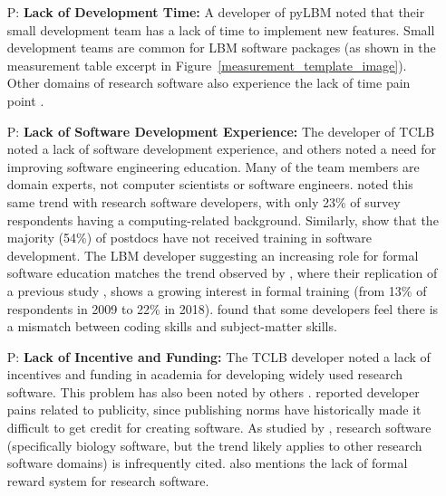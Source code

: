 \documentclass[final, 3p, times, authoryear]{elsarticle}
\newcounter{pnum} %
\begin{document}
\begin{enumerate}

	\item[P\refstepcounter{pnum}\thepnum \label{P_LackDevTime}:] \textbf{Lack of
	Development Time:} A developer of pyLBM noted that their small development
	team has a lack of time to implement new features. Small development teams
	are common for LBM software packages (as shown in the measurement table
	excerpt in Figure~\ref{measurement_template_image}). Other domains of
	research software also experience the lack of time pain point
	\citep{PintoEtAl2018, PintoEtAl2016, WieseEtAl2019}.

	\item[P\refstepcounter{pnum}\thepnum \label{P_LackSoftDevExp}:] \textbf{Lack
	of Software Development Experience:} The developer of TCLB noted a lack of
	software development experience, and others noted a need for improving
	software engineering education. Many of the team members are domain experts,
	not computer scientists or software engineers. \citet{Nguyen-HoanEtAl2010}
	noted this same trend with research software developers, with only 23\% of
	survey respondents having a computing-related background. Similarly,
	\citet{UditAndKatz2017} show that the majority (54\%) of postdocs have not
	received training in software development.  The LBM developer suggesting an
	increasing role for formal software education matches the trend observed by
	\citet{PintoEtAl2018}, where their replication of a previous study
	\citep{HannayEtAl2009}, shows a growing interest in formal training (from
	13\% of respondents in 2009 to 22\% in 2018). \citet{PintoEtAl2018} found
	that some developers feel there is a mismatch between coding skills and
	subject-matter skills. 

	\item[P\refstepcounter{pnum}\thepnum \label{P_LackFunding}:] \textbf{Lack of
	Incentive and Funding:} The TCLB developer noted a lack of incentives and
	funding in academia for developing widely used research software. This
	problem has also been noted by others \citep{gewaltig2012quality, Goble2014,
	KaterbowAndFeulner2018}.  \citet{WieseEtAl2019} reported developer pains
	related to publicity, since publishing norms have historically made it
	difficult to get credit for creating software.  As studied by
	\citet{HowisonAndBullard2016}, research software (specifically biology
	software, but the trend likely applies to other research software domains)
	is infrequently cited.  \citet{PintoEtAl2018} also mentions the lack of
	formal reward system for research software.


\end{enumerate}
\end{document}
